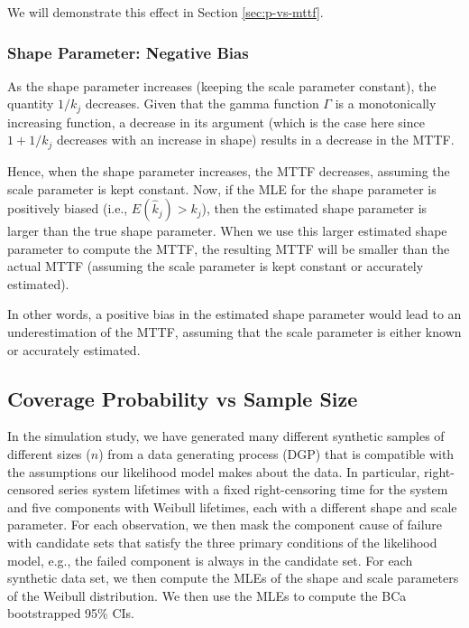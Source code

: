 \documentclass[
]{article}
\begin{document}
We will demonstrate this effect in Section \ref{sec:p-vs-mttf}.

\hypertarget{shape-parameter-negative-bias}{%
\subsubsection{Shape Parameter: Negative
Bias}\label{shape-parameter-negative-bias}}

As the shape parameter increases (keeping the scale parameter constant),
the quantity \(1/k_j\) decreases. Given that the gamma function
\(\Gamma\) is a monotonically increasing function, a decrease in its
argument (which is the case here since \(1 + 1/k_j\) decreases with an
increase in shape) results in a decrease in the MTTF.

Hence, when the shape parameter increases, the MTTF decreases, assuming
the scale parameter is kept constant. Now, if the MLE for the shape
parameter is positively biased (i.e., \(E(\hat k_j) > k_j\)), then the
estimated shape parameter is larger than the true shape parameter. When
we use this larger estimated shape parameter to compute the MTTF, the
resulting MTTF will be smaller than the actual MTTF (assuming the scale
parameter is kept constant or accurately estimated).

In other words, a positive bias in the estimated shape parameter would
lead to an underestimation of the MTTF, assuming that the scale
parameter is either known or accurately estimated.

\hypertarget{coverage-probability-vs-sample-size}{%
\subsection{Coverage Probability vs Sample
Size}\label{coverage-probability-vs-sample-size}}

In the simulation study, we have generated many different synthetic
samples of different sizes (\(n\)) from a data generating process (DGP)
that is compatible with the assumptions our likelihood model makes about
the data. In particular, right-censored series system lifetimes with a
fixed right-censoring time for the system and five components with
Weibull lifetimes, each with a different shape and scale parameter. For
each observation, we then mask the component cause of failure with
candidate sets that satisfy the three primary conditions of the
likelihood model, e.g., the failed component is always in the candidate
set. For each synthetic data set, we then compute the MLEs of the shape
and scale parameters of the Weibull distribution. We then use the MLEs
to compute the BCa bootstrapped 95\% CIs.
\end{document}
